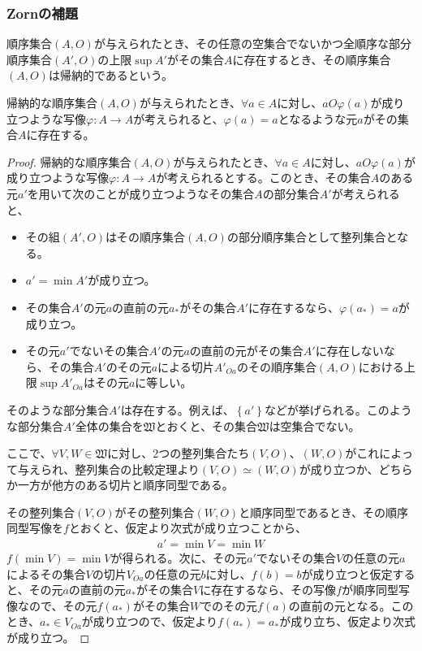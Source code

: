 \documentclass[dvipdfmx]{jsarticle}
\begin{document}
\subsubsection{Zornの補題}%
\begin{dfn}
順序集合$(A,O)$が与えられたとき、その任意の空集合でないかつ全順序な部分順序集合$\left( A',O \right)$の上限$\sup A'$がその集合$A$に存在するとき、その順序集合$(A,O)$は帰納的であるという。
\end{dfn}
\begin{thm}\label{1.3.3.3}
帰納的な順序集合$(A,O)$が与えられたとき、$\forall a \in A$に対し、$aO\varphi(a)$が成り立つような写像$\varphi:A \rightarrow A$が考えられると、$\varphi(a) = a$となるような元$a$がその集合$A$に存在する。
\end{thm}
\begin{proof}
帰納的な順序集合$(A,O)$が与えられたとき、$\forall a \in A$に対し、$aO\varphi(a)$が成り立つような写像$\varphi:A \rightarrow A$が考えられるとする。このとき、その集合$A$のある元$a'$を用いて次のことが成り立つようなその集合$A$の部分集合$A'$が考えられると、
\begin{itemize}
\item
  その組$\left( A',O \right)$はその順序集合$(A,O)$の部分順序集合として整列集合となる。
\item
  $a' = \min A'$が成り立つ。
\item
  その集合$A'$の元$a$の直前の元$a_{*}$がその集合$A'$に存在するなら、$\varphi\left( a_{*} \right) = a$が成り立つ。
\item
  その元$a'$でないその集合$A'$の元$a$の直前の元がその集合$A'$に存在しないなら、その集合$A'$のその元$a$による切片${A'}_{Oa}$のその順序集合$(A,O)$における上限$\sup{A'}_{Oa}$はその元$a$に等しい。
\end{itemize}
そのような部分集合$A'$は存在する。例えば、$\left\{ a' \right\}$などが挙げられる。このような部分集合$A'$全体の集合を$\mathfrak{W}$とおくと、その集合$\mathfrak{W}$は空集合でない。\par
ここで、$\forall V,W\in \mathfrak{W}$に対し、2つの整列集合たち$(V,O)$、$(W,O)$がこれによって与えられ、整列集合の比較定理より$(V,O) \simeq (W,O)$が成り立つか、どちらか一方が他方のある切片と順序同型である。\par
その整列集合$(V,O)$がその整列集合$(W,O)$と順序同型であるとき、その順序同型写像を$f$とおくと、仮定より次式が成り立つことから、
\begin{align*}
a' = \min V = \min W
\end{align*}
$f\left( \min V \right) = \min V$が得られる。次に、その元$a'$でないその集合$V$の任意の元$a$によるその集合$V$の切片$V_{Oa}$の任意の元$b$に対し、$f(b) = b$が成り立つと仮定すると、その元$a$の直前の元$a_{*}$がその集合$V$に存在するなら、その写像$f$が順序同型写像なので、その元$f\left( a_{*} \right)$がその集合$W$でのその元$f(a)$の直前の元となる。このとき、$a_{*} \in V_{Oa}$が成り立つので、仮定より$f\left( a_{*} \right) = a_{*}$が成り立ち、仮定より次式が成り立つ。

\end{proof}
\end{document}
